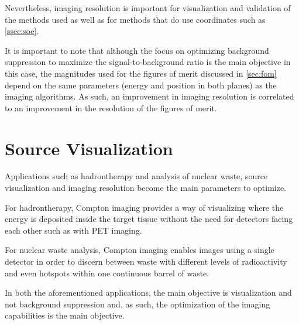 Nevertheless, imaging resolution is important for visualization and validation of the methods used as well as for methods that do use coordinates such as \ref{ssec:soe}.

It is important to note that although the focus on optimizing background suppression to maximize the signal-to-background ratio is the main objective in this case, the magnitudes used for the figures of merit discussed in \ref{sec:fom} depend on the same parameters (energy and position in both planes) as the imaging algorithms. As such, an improvement in imaging resolution is correlated to an improvement in the resolution of the figures of merit.

\section{Source Visualization}

Applications such as hadrontherapy and analysis of nuclear waste, source visualization and imaging resolution become the main parameters to optimize.

For hadrontherapy, Compton imaging provides a way of visualizing where the energy is deposited inside the target tissue without the need for detectors facing each other such as with PET imaging.

For nuclear waste analysis, Compton imaging enables images using a single detector in order to discern between waste with different levels of radioactivity and even hotspots within one continuous barrel of waste.

In both the aforementioned applications, the main objective is visualization and not background suppression and, as such, the optimization of the imaging capabilities is the main objective.